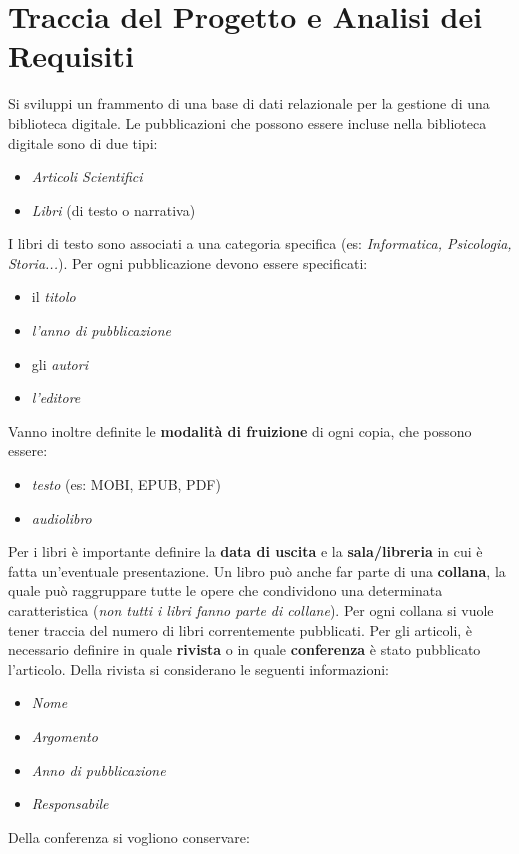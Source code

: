 \documentclass[a4paper, 15pt, oneside]{article}
\begin{document}
	\section{Traccia del Progetto e Analisi dei Requisiti}
	Si sviluppi un frammento di una base di dati relazionale per la gestione di una biblioteca digitale.
	Le pubblicazioni che possono essere incluse nella biblioteca digitale sono di due tipi:
	\begin{itemize} 
		\item \textit{Articoli Scientifici}
		\item \textit{Libri} (di testo o narrativa)
	\end{itemize}
	I libri di testo sono associati a una categoria specifica (es: \textit{Informatica, Psicologia, Storia...}).
	Per ogni pubblicazione devono essere specificati:
	\begin{itemize}
		\item il \textit{titolo}
		\item \textit{l’anno di pubblicazione}
		\item gli \textit{autori}
		\item \textit{l’editore}
	\end{itemize}
	Vanno inoltre definite le \textbf{modalità di fruizione} di ogni copia, che possono essere:
	\begin{itemize}
		\item \textit{testo} (es: MOBI, EPUB, PDF)
		\item \textit{audiolibro}
	\end{itemize}
	Per i libri è importante definire la \textbf{data di uscita} e la \textbf{sala/libreria} in cui è fatta un’eventuale presentazione.
	Un libro può anche far parte di una \textbf{collana}, la quale può raggruppare tutte le opere che condividono una determinata caratteristica (\textit{non tutti i libri fanno parte di collane}). Per ogni collana si vuole tener traccia del numero di libri correntemente pubblicati.
	Per gli articoli, è necessario definire in quale \textbf{rivista} o in quale \textbf{conferenza} è stato pubblicato l’articolo. 
	Della rivista si considerano le seguenti informazioni:
	\begin{itemize}
		\item \textit{Nome}
		\item \textit{Argomento}
		\item \textit{Anno di pubblicazione}
		\item \textit{Responsabile}
	\end{itemize}
	Della conferenza si vogliono conservare:
\end{document}
